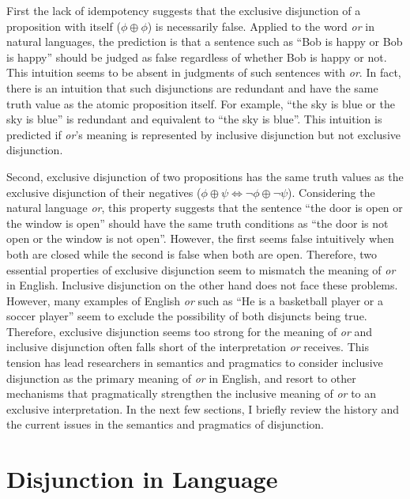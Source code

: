 \documentclass[oneside]{report}
\theoremstyle{definition}
\theoremstyle{definition}
\theoremstyle{definition}
\theoremstyle{remark}
\begin{document}
First the lack of idempotency suggests that the exclusive disjunction of
a proposition with itself (\(\phi \oplus \phi\)) is necessarily false.
Applied to the word \emph{or} in natural languages, the prediction is
that a sentence such as ``Bob is happy or Bob is happy'' should be
judged as false regardless of whether Bob is happy or not. This
intuition seems to be absent in judgments of such sentences with
\emph{or}. In fact, there is an intuition that such disjunctions are
redundant and have the same truth value as the atomic proposition
itself. For example, ``the sky is blue or the sky is blue'' is redundant
and equivalent to ``the sky is blue''. This intuition is predicted if
\emph{or}'s meaning is represented by inclusive disjunction but not
exclusive disjunction.

Second, exclusive disjunction of two propositions has the same truth
values as the exclusive disjunction of their negatives
(\(\phi \oplus \psi \Leftrightarrow \lnot\phi \oplus \lnot\psi\)).
Considering the natural language \emph{or}, this property suggests that
the sentence ``the door is open or the window is open'' should have the
same truth conditions as ``the door is not open or the window is not
open''. However, the first seems false intuitively when both are closed
while the second is false when both are open. Therefore, two essential
properties of exclusive disjunction seem to mismatch the meaning of
\emph{or} in English. Inclusive disjunction on the other hand does not
face these problems. However, many examples of English \emph{or} such as
``He is a basketball player or a soccer player'' seem to exclude the
possibility of both disjuncts being true. Therefore, exclusive
disjunction seems too strong for the meaning of \emph{or} and inclusive
disjunction often falls short of the interpretation \emph{or} receives.
This tension has lead researchers in semantics and pragmatics to
consider inclusive disjunction as the primary meaning of \emph{or} in
English, and resort to other mechanisms that pragmatically strengthen
the inclusive meaning of \emph{or} to an exclusive interpretation. In
the next few sections, I briefly review the history and the current
issues in the semantics and pragmatics of disjunction.

\section{Disjunction in Language}\label{disjunction-in-language}
\end{document}
